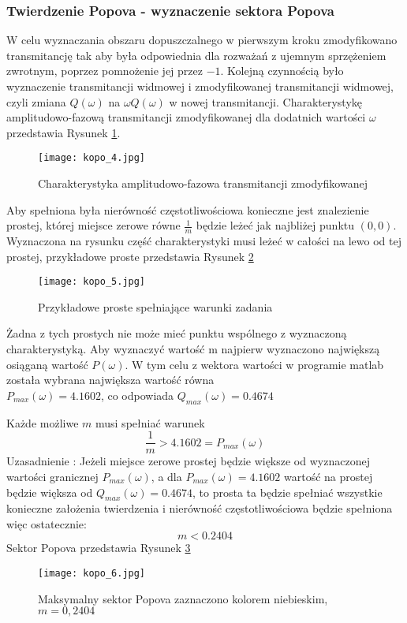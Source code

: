\documentclass[a4paper,11pt]{article}
\begin{document}
\subsubsection{Twierdzenie Popova - wyznaczenie sektora Popova}
W celu wyznaczania obszaru dopuszczalnego w pierwszym kroku zmodyfikowano transmitancję tak aby była odpowiednia dla rozważań z ujemnym sprzężeniem zwrotnym, poprzez pomnożenie jej przez \(-1\).
Kolejną czynnością było wyznaczenie transmitancji widmowej i zmodyfikowanej transmitancji widmowej, czyli zmiana \(Q(\omega)
\) na \(\omega Q(\omega)\) w nowej transmitancji. Charakterystykę amplitudowo-fazową transmitancji zmodyfikowanej dla dodatnich wartości \( \omega \) przedstawia Rysunek \ref{fig:kopo_4}.
\begin{figure}[H]
\centerline{\texttt{[image: kopo\_4.jpg]}}
\centering
\caption{Charakterystyka amplitudowo-fazowa transmitancji zmodyfikowanej}
\label{fig:kopo_4}
\end{figure}
Aby spełniona była nierówność częstotliwościowa konieczne jest znalezienie prostej, której miejsce zerowe równe \( \frac{1}{m} \) będzie leżeć jak najbliżej punktu \( (0,0) \). Wyznaczona na rysunku część charakterystyki musi leżeć w całości na lewo od tej prostej, przykładowe proste przedstawia Rysunek \ref{fig:kopo_5}
\begin{figure}[H]
\centerline{\texttt{[image: kopo\_5.jpg]}}
\centering
\caption{Przykładowe proste spełniające warunki zadania}
\label{fig:kopo_5}
\end{figure}
Żadna z tych prostych nie może mieć punktu wspólnego z wyznaczoną charakterystyką. Aby wyznaczyć wartość m najpierw wyznaczono największą osiąganą wartość \( P(\omega)\). W tym celu z wektora wartości w programie matlab została wybrana największa wartość równa \\ 
\(P_{max}(\omega)  = 4.1602  \),
co odpowiada 
\(Q_{max}(\omega)  = 0.4674  \)

Każde możliwe \(m\) musi spełniać warunek 
\begin{equation*}
\frac{1}{m}>4.1602=P_{max}(\omega)
\end{equation*}
Uzasadnienie : Jeżeli miejsce zerowe prostej będzie większe od wyznaczonej wartości granicznej \(P_{max}(\omega) \), a dla  \(P_{max}(\omega)  = 4.1602  \) wartość na prostej będzie większa od \(Q_{max}(\omega)  = 0.4674  \), to prosta ta będzie spełniać wszystkie konieczne założenia twierdzenia i nierówność częstotliwościowa będzie spełniona więc ostatecznie: 
\begin{equation*}
m<0.2404
\end{equation*}
Sektor Popova przedstawia Rysunek \ref{fig:kopo_6}
\begin{figure}[H]
\centerline{\texttt{[image: kopo\_6.jpg]}}
\centering
\caption{Maksymalny sektor Popova zaznaczono kolorem niebieskim, \( m = 0,2404 \) }
\label{fig:kopo_6}
\end{figure}
\end{document}
